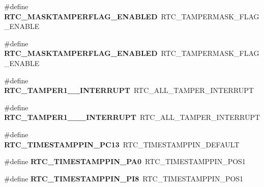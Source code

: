 \begin{DoxyCompactItemize}
\mbox{\label{group___h_a_l___r_t_c___aliased___defines_gab9424e57ef6067b1d7f5030ee45192d5}} 
\#define {\bfseries R\+T\+C\+\_\+\+M\+A\+S\+K\+T\+A\+M\+P\+E\+R\+F\+L\+A\+G\+\_\+\+E\+N\+A\+B\+L\+ED}~R\+T\+C\+\_\+\+T\+A\+M\+P\+E\+R\+M\+A\+S\+K\+\_\+\+F\+L\+A\+G\+\_\+\+E\+N\+A\+B\+LE
\item 
\mbox{\label{group___h_a_l___r_t_c___aliased___defines_gab9424e57ef6067b1d7f5030ee45192d5}} 
\#define {\bfseries R\+T\+C\+\_\+\+M\+A\+S\+K\+T\+A\+M\+P\+E\+R\+F\+L\+A\+G\+\_\+\+E\+N\+A\+B\+L\+ED}~R\+T\+C\+\_\+\+T\+A\+M\+P\+E\+R\+M\+A\+S\+K\+\_\+\+F\+L\+A\+G\+\_\+\+E\+N\+A\+B\+LE
\item 
\mbox{\label{group___h_a_l___r_t_c___aliased___defines_gad52c576aeb40eeeed3274e6a8c5cf83a}} 
\#define {\bfseries R\+T\+C\+\_\+\+T\+A\+M\+P\+E\+R1\+\_\+\_\+\+I\+N\+T\+E\+R\+R\+U\+PT}~R\+T\+C\+\_\+\+A\+L\+L\+\_\+\+T\+A\+M\+P\+E\+R\+\_\+\+I\+N\+T\+E\+R\+R\+U\+PT
\item 
\mbox{\label{group___h_a_l___r_t_c___aliased___defines_ga30a97d2cbfeca6b663b9f116e13c511a}} 
\#define {\bfseries R\+T\+C\+\_\+\+T\+A\+M\+P\+E\+R1\+\_\+\_\+\_\+\+I\+N\+T\+E\+R\+R\+U\+PT}~R\+T\+C\+\_\+\+A\+L\+L\+\_\+\+T\+A\+M\+P\+E\+R\+\_\+\+I\+N\+T\+E\+R\+R\+U\+PT
\item 
\mbox{\label{group___h_a_l___r_t_c___aliased___defines_ga86b6c9d9b06b1ab23722bf02799adfca}} 
\#define {\bfseries R\+T\+C\+\_\+\+T\+I\+M\+E\+S\+T\+A\+M\+P\+P\+I\+N\+\_\+\+P\+C13}~R\+T\+C\+\_\+\+T\+I\+M\+E\+S\+T\+A\+M\+P\+P\+I\+N\+\_\+\+D\+E\+F\+A\+U\+LT
\item 
\mbox{\label{group___h_a_l___r_t_c___aliased___defines_ga8d806818f1fcdaf744042a19563a8052}} 
\#define {\bfseries R\+T\+C\+\_\+\+T\+I\+M\+E\+S\+T\+A\+M\+P\+P\+I\+N\+\_\+\+P\+A0}~R\+T\+C\+\_\+\+T\+I\+M\+E\+S\+T\+A\+M\+P\+P\+I\+N\+\_\+\+P\+O\+S1
\item 
\mbox{\label{group___h_a_l___r_t_c___aliased___defines_ga06c626929730d0b055830978be00b438}} 
\#define {\bfseries R\+T\+C\+\_\+\+T\+I\+M\+E\+S\+T\+A\+M\+P\+P\+I\+N\+\_\+\+P\+I8}~R\+T\+C\+\_\+\+T\+I\+M\+E\+S\+T\+A\+M\+P\+P\+I\+N\+\_\+\+P\+O\+S1

\end{DoxyCompactItemize}
